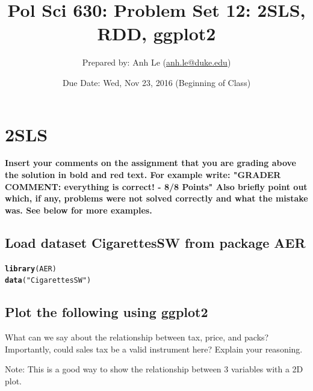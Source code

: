 \documentclass{article}\usepackage[]{graphicx}\usepackage[]{color}
\makeatletter
\newcommand{\hlstr}[1]{\textcolor[rgb]{0.192,0.494,0.8}{#1}}%
\newcommand{\hlstd}[1]{\textcolor[rgb]{0.345,0.345,0.345}{#1}}%
\newcommand{\hlkwd}[1]{\textcolor[rgb]{0.737,0.353,0.396}{\textbf{#1}}}%
\newenvironment{kframe}{%
 \def\at@end@of@kframe{}%
 \ifinner\ifhmode%
  \def\at@end@of@kframe{\end{minipage}}%
  \begin{minipage}{\columnwidth}%
 \fi\fi%
 \def\FrameCommand##1{\hskip\@totalleftmargin \hskip-\fboxsep
 \colorbox{shadecolor}{##1}\hskip-\fboxsep
     \hskip-\linewidth \hskip-\@totalleftmargin \hskip\columnwidth}%
 \MakeFramed {\advance\hsize-\width
   \@totalleftmargin\z@ \linewidth\hsize
   \@setminipage}}%
 {\par\unskip\endMakeFramed%
 \at@end@of@kframe}
\newenvironment{knitrout}{}{} %
\makeatother
\begin{document}
\title{Pol Sci 630:  Problem Set 12: 2SLS, RDD, ggplot2}

\author{Prepared by: Anh Le (\href{mailto:anh.le@duke.edu}{anh.le@duke.edu})}

\date{Due Date: Wed, Nov 23, 2016 (Beginning of Class)}

\maketitle

\section{2SLS}

\textbf{\color{red} Insert your comments on the assignment that you are grading above the solution in bold and red text. For example write: "GRADER COMMENT: everything is correct! - 8/8 Points" Also briefly point out which, if any, problems were not solved correctly and what the mistake was. See below for more examples.}

\subsection{Load dataset CigarettesSW from package AER}

\begin{knitrout}
\color{fgcolor}\begin{kframe}
\begin{alltt}
\hlkwd{library}\hlstd{(AER)}
\hlkwd{data}\hlstd{(}\hlstr{"CigarettesSW"}\hlstd{)}
\end{alltt}
\end{kframe}
\end{knitrout}

\subsection{Plot the following using ggplot2}

What can we say about the relationship between tax, price, and packs? Importantly, could sales tax be a valid instrument here? Explain your reasoning.

Note: This is a good way to show the relationship between 3 variables with a 2D plot.
\end{document}

